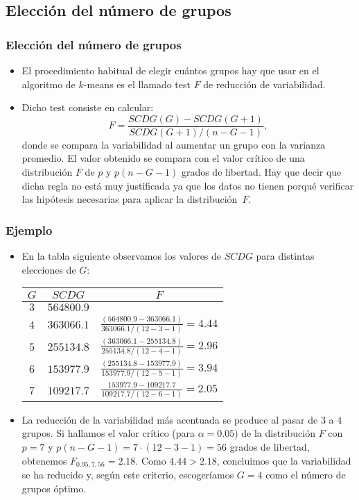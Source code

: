 \subsection{Elección del número de grupos}
\begin{frame}
\frametitle{Elección del número de grupos}
\begin{itemize}
\item<2->{El procedimiento habitual de elegir cuántos grupos hay que usar en el algoritmo de $k$-means es el llamado test $F$ de reducción de variabilidad.}
\item<3->{Dicho test consiste en calcular:
$$
F=\frac{SCDG(G)-SCDG(G+1)}{SCDG(G+1)/(n-G-1)},
$$
donde se compara la variabilidad al aumentar un grupo con la varianza promedio. El valor obtenido se compara con el valor crítico de una distribución $F$ de $p$ y $p(n-G-1)$ grados de libertad. Hay que decir que dicha regla no está muy justificada ya que los datos no tienen porqué verificar las hipótesis necesarias para aplicar la distribución~$F$.}
\end{itemize}
\end{frame}
\begin{frame}
\frametitle{Ejemplo}
\begin{itemize}
\item<2->{En la tabla siguiente observamos los valores de $SCDG$ para distintas elecciones de $G$:
\begin{center}
\begin{tabular}{|c|c|c|}\hline
$G$&$SCDG$&$F$\\\hline
$3$&$564800.9$& \\\hline
$4$&$363066.1$&$\frac{(564800.9-363066.1)}{363066.1/(12-3-1)}=4.44$\\\hline
$5$&$255134.8$&$\frac{(363066.1-255134.8)}{255134.8/(12-4-1)}=2.96$\\\hline
$6$&$153977.9$&$\frac{(255134.8-153977.9)}{153977.9/(12-5-1)}=3.94$\\\hline
$7$&$109217.7$&$\frac{153977.9-109217.7}{109217.7/(12-6-1)}=2.05$\\\hline
\end{tabular}
\end{center}}
\item<3->{La reducción de la variabilidad más acentuada se produce al pasar de $3$ a $4$ grupos. Si hallamos el valor crítico (para $\alpha =0.05$) de la distribución $F$ con $p=7$ y $p(n-G-1)=7\cdot (12-3-1)=56$ grados de libertad, obtenemos $F_{0.95,7,56}=2.18$. Como $4.44 > 2.18$, concluimos que la variabilidad se ha reducido y, según este criterio, escogeríamos $G=4$ como el número de grupos óptimo.}
\end{itemize}
\end{frame}
